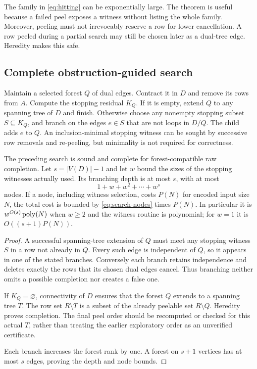 The family in \eqref{eq:hitting} can be exponentially large.  The theorem
is useful because a failed peel exposes a witness without listing the
whole family.  Moreover, peeling must not irrevocably reserve a row for
lower cancellation.  A row peeled during a partial search may still be
chosen later as a dual-tree edge.  Heredity makes this safe.

\subsection{Complete obstruction-guided search}
Maintain a selected forest $Q$ of dual edges.  Contract it in $D$ and remove
its rows from $A$.  Compute the stopping residual $K_Q$.  If it is empty,
extend $Q$ to any spanning tree of $D$ and finish.  Otherwise choose any
nonempty stopping subset $S\subseteq K_Q$, and branch on the edges
$e\in S$ that are not loops in $D/Q$.  The child adds $e$ to $Q$.
An inclusion-minimal stopping witness can be sought by successive row
removals and re-peeling, but minimality is not required for correctness.

\begin{theorem}\label{thm:search}
The preceding search is sound and complete for forest-compatible raw
completion.  Let $s=|V(D)|-1$ and let $w$ bound the sizes of the stopping
witnesses actually used.  Its branching depth is at most $s$, with at most
\begin{equation}\label{eq:search-nodes}
                     1+w+w^2+\cdots+w^s
\end{equation}
nodes.  If a node, including witness selection, costs $P(N)$ for encoded
input size $N$, the total cost is bounded by \eqref{eq:search-nodes} times
$P(N)$.  In particular it is $w^{O(s)}\operatorname{poly}(N)$ when $w\geq2$ and the
witness routine is polynomial; for $w=1$ it is $O((s+1)P(N))$.
\end{theorem}
\begin{proof}
A successful spanning-tree extension of $Q$ must meet any stopping witness
$S$ in a row not already in $Q$.  Every such edge is independent of $Q$,
so it appears in one of the stated branches.  Conversely each branch
retains independence and deletes exactly the rows that its chosen dual
edges cancel.  Thus branching neither omits a possible completion nor
creates a false one.

If $K_Q=\varnothing$, connectivity of $D$ ensures that the forest $Q$
extends to a spanning tree $T$.  The row set $R\setminus T$
is a subset of the already peelable set $R\setminus Q$.  Heredity proves
completion.  The final peel order should be recomputed or checked for
this actual $T$, rather than treating the earlier exploratory order as
an unverified certificate.

Each branch increases the forest rank by one.  A forest on $s+1$ vertices
has at most $s$ edges, proving the depth and node bounds.
\end{proof}

